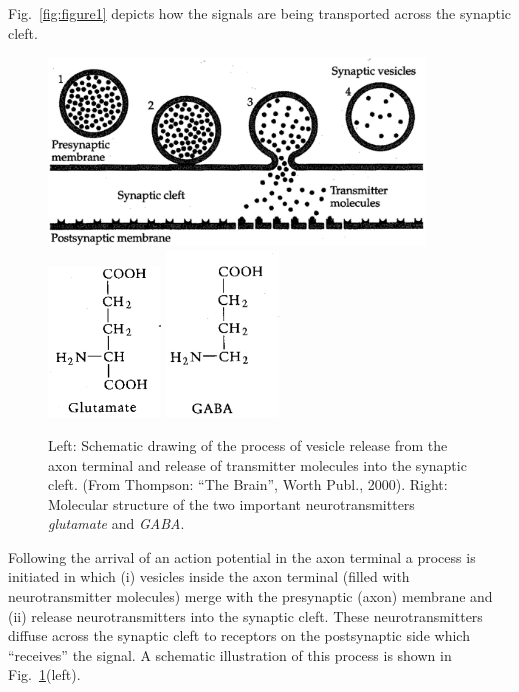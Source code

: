 \documentclass{article}
\begin{document}
Fig.~\ref{fig:figure1} depicts how the signals are being transported across the synaptic cleft. \\
\begin{figure}[t]
\centerline{\includegraphics[width=10cm]{thompsonB2000-p39.eps}
\includegraphics[width=3cm]{kandel-B1991-p217-glutamate.eps}
\includegraphics[width=3cm]{kandel-B1991-p217-GABA.eps}}
\caption{\small Left: Schematic drawing
of the process of vesicle release from the axon terminal and release of
transmitter molecules into the synaptic cleft. (From Thompson: ``The
Brain'', Worth Publ., 2000). Right: Molecular structure of the
two important neurotransmitters \emph{glutamate} and \emph{GABA}.}
\label{fig:figure2}
\end{figure}
Following the arrival of an action potential in the axon terminal a
process is initiated in which (i) vesicles inside the axon terminal
(filled with neurotransmitter molecules) merge with the presynaptic
(axon) membrane and (ii) release neurotransmitters into the synaptic
cleft. These neurotransmitters diffuse across the synaptic cleft to
receptors on the postsynaptic side which ``receives'' the signal.
A schematic illustration of this process is shown in
Fig.~\ref{fig:figure2}(left).
\end{document}
